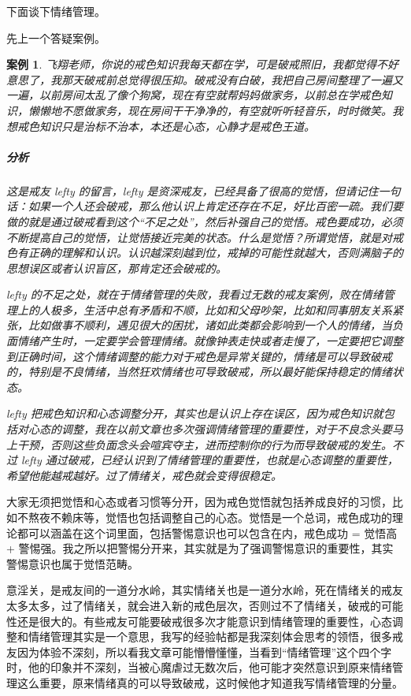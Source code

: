 \documentclass{ctexart}
\newtheorem{case}{案例}
\begin{document}
下面谈下情绪管理。

先上一个答疑案例。

\begin{case}
    飞翔老师，你说的戒色知识我每天都在学，可是破戒照旧，我都觉得不好意思了，我那天破戒前总觉得很压抑。破戒没有白破，我把自己房间整理了一遍又一遍，以前房间太乱了像个狗窝，现在有空就帮妈妈做家务，以前总在学戒色知识，懒懒地不愿做家务，现在房间干干净净的，有空就听听轻音乐，时时微笑。我想戒色知识只是治标不治本，本还是心态，心静才是戒色王道。
    \subparagraph{分析} 这是戒友 lefty 的留言，lefty 是资深戒友，已经具备了很高的觉悟，但请记住一句话：如果一个人还会破戒，那么他认识上肯定还存在不足，好比百密一疏。我们要做的就是通过破戒看到这个“不足之处”，然后补强自己的觉悟。戒色要成功，必须不断提高自己的觉悟，让觉悟接近完美的状态。什么是觉悟？所谓觉悟，就是对戒色有正确的理解和认识。认识越深刻越到位，戒掉的可能性就越大，否则满脑子的思想误区或者认识盲区，那肯定还会破戒的。

    lefty 的不足之处，就在于情绪管理的失败，我看过无数的戒友案例，败在情绪管理上的人极多，生活中总有矛盾和不顺，比如和父母吵架，比如和同事朋友关系紧张，比如做事不顺利，遇见很大的困扰，诸如此类都会影响到一个人的情绪，当负面情绪产生时，一定要学会管理情绪。就像钟表走快或者走慢了，一定要把它调整到正确时间，这个情绪调整的能力对于戒色是异常关键的，情绪是可以导致破戒的，特别是不良情绪，当然狂欢情绪也可导致破戒，所以最好能保持稳定的情绪状态。

    lefty 把戒色知识和心态调整分开，其实也是认识上存在误区，因为戒色知识就包括对心态的调整，我在以前文章也多次强调情绪管理的重要性，对于不良念头要马上干预，否则这些负面念头会喧宾夺主，进而控制你的行为而导致破戒的发生。不过 lefty 通过破戒，已经认识到了情绪管理的重要性，也就是心态调整的重要性，希望他能越戒越好。过了情绪关，戒色就会变得很稳定。
\end{case}

大家无须把觉悟和心态或者习惯等分开，因为戒色觉悟就包括养成良好的习惯，比如不熬夜不赖床等，觉悟也包括调整自己的心态。觉悟是一个总词，戒色成功的理论都可以涵盖在这个词里面，包括警惕意识也可以包含在内，戒色成功 = 觉悟高 + 警惕强。我之所以把警惕分开来，其实就是为了强调警惕意识的重要性，其实警惕意识也属于觉悟范畴。

意淫关，是戒友间的一道分水岭，其实情绪关也是一道分水岭，死在情绪关的戒友太多太多，过了情绪关，就会进入新的戒色层次，否则过不了情绪关，破戒的可能性还是很大的。有些戒友可能要破戒很多次才能意识到情绪管理的重要性，心态调整和情绪管理其实是一个意思，我写的经验帖都是我深刻体会思考的领悟，很多戒友因为体验不深刻，所以看我文章可能懵懵懂懂，当看到“情绪管理”这个四个字时，他的印象并不深刻，当被心魔虐过无数次后，他可能才突然意识到原来情绪管理这么重要，原来情绪真的可以导致破戒，这时候他才知道我写情绪管理的分量。
\end{document}
